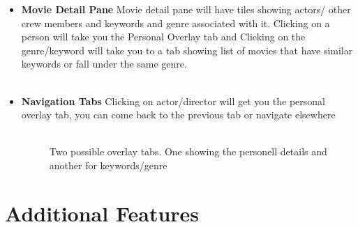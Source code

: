 \documentclass{report}
\begin{document}
\begin{itemize}
\item{\textbf{Movie Detail Pane}}
Movie detail pane will have tiles showing actors/ other crew members and keywords and genre associated with it. Clicking on a person will take you the Personal Overlay tab and Clicking on the genre/keyword will take you to a tab showing list of movies that have similar keywords or fall under the same genre.\\\\
\item{\textbf{Navigation Tabs}}
Clicking on actor/director will get you the personal overlay tab, you can come back to the previous tab or navigate elsewhere\\\\
\begin{figure}[H]
	\caption{Two possible overlay tabs. One showing the personell details and another for keywords/genre}
	\label{Fig:2}
\end{figure}

\end{itemize}


\section{Additional Features}
\end{document}
